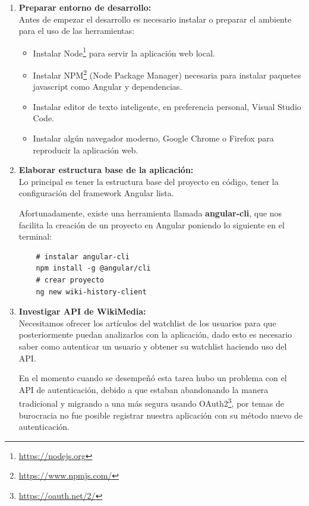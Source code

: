 \begin{enumerate}
  \item\textbf{Preparar entorno de desarrollo:}\\
  
  Antes de empezar el desarrollo es necesario instalar o preparar el ambiente para el uso de las herramientas:
  \begin{itemize}
      \item Instalar Node\footnote{\url{https://nodejs.org}} para servir la aplicación web local.
      \item Instalar NPM\footnote{\url{https://www.npmjs.com/}} (Node Package Manager) necesaria para instalar paquetes javascript como Angular y dependencias.
      \item Instalar editor de texto inteligente, en preferencia personal, Visual Studio Code.
      \item Instalar algún navegador moderno, Google Chrome o Firefox para reproducir la aplicación web.
  \end{itemize}
  
  \item\textbf{Elaborar estructura base de la aplicación:}\\
  Lo principal es tener la estructura base del proyecto en código, tener la configuración del framework Angular lista.
  
  Afortunadamente, existe una herramienta llamada \textbf{angular-cli}, que nos facilita la creación de un proyecto en Angular poniendo lo siguiente en el terminal:
  \begin{verbatim}
    # instalar angular-cli
    npm install -g @angular/cli
    # crear proyecto
    ng new wiki-history-client
  \end{verbatim}
  
  \item\textbf{Investigar API de WikiMedia:}\\
  
  Necesitamos ofrecer los artículos del watchlist de los usuarios para que posteriormente puedan analizarlos con la aplicación, dado esto es necesario saber como autenticar un usuario y obtener su watchlist haciendo uso del API.
  
  En el momento cuando se desempeñó esta tarea hubo un problema con el API de autenticación, debido a que estaban abandonando la manera tradicional y migrando a una más segura usando OAuth2\footnote{\url{https://oauth.net/2/}}, por temas de burocracia no fue posible registrar nuestra aplicación con su método nuevo de autenticación.
  

\end{enumerate}
